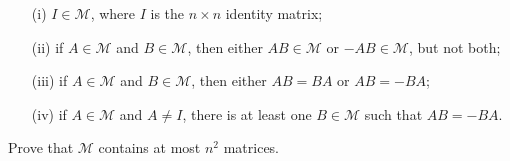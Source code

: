 \begin{itemize}
\item[(i)] $I \in \mathcal{M}$, where $I$ is the $n \times n$ identity matrix;

\item[(ii)] if $A \in \mathcal{M}$ and $B \in \mathcal{M}$, then either $AB \in \mathcal{M}$ or
$-AB \in \mathcal{M}$, but not both;

\item[(iii)] if $A \in \mathcal{M}$ and $B \in \mathcal{M}$, then either $AB = BA$ or
$AB = -BA$;

\item[(iv)] if $A \in \mathcal{M}$ and $A \neq I$, there is at least one $B \in
\mathcal{M}$ such that $AB = - BA$.
\end{itemize}
Prove that $\mathcal{M}$ contains at most $n^2$ matrices.
